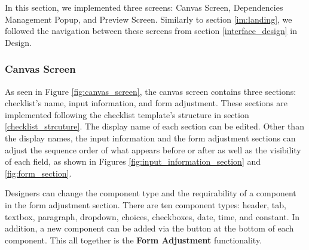 In this section, we implemented three screens: Canvas Screen, Dependencies Management Popup, and Preview Screen. Similarly to section \ref{im:landing}, we followed the navigation between these screens from section \ref{interface_design} in Design.



\subsubsection{Canvas Screen}
\label{im:canvas_screen}


As seen in Figure \ref{fig:canvas_screen}, the canvas screen contains three sections: checklist’s name, input information, and form adjustment. These sections are implemented following the checklist template's structure in section \ref{checklist_strcuture}. The display name of each section can be edited. Other than the display names, the input information and the form adjustment sections can adjust the sequence order of what appears before or after as well as the visibility of each field, as shown in Figures \ref{fig:input_information_section} and \ref{fig:form_section}.


Designers can change the component type and the requirability of a component in the form adjustment section. There are ten component types: header, tab, textbox, paragraph, dropdown, choices, checkboxes, date, time, and constant. In addition, a new component can be added via the button at the bottom of each component. This all together is the \textbf{Form Adjustment} functionality.

